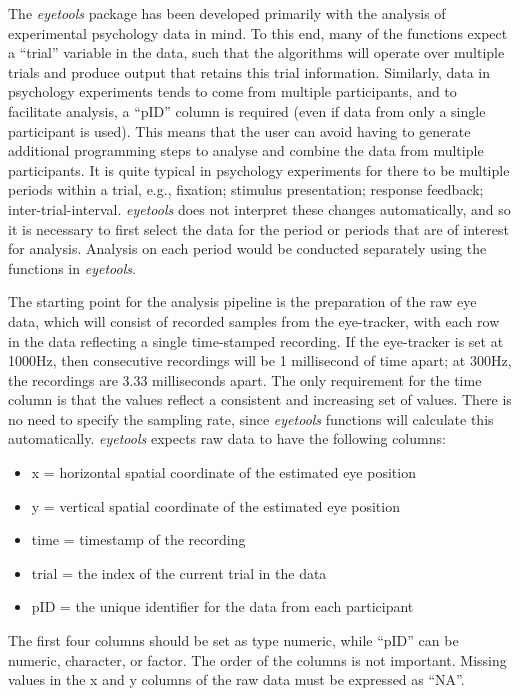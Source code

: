\documentclass[
  man,
  floatsintext,
  longtable,
  nolmodern,
  notxfonts,
  notimes,
  colorlinks=true,linkcolor=blue,citecolor=blue,urlcolor=blue]{apa7}
\begin{document}
The \emph{eyetools} package has been developed primarily with the
analysis of experimental psychology data in mind. To this end, many of
the functions expect a ``trial'' variable in the data, such that the
algorithms will operate over multiple trials and produce output that
retains this trial information. Similarly, data in psychology
experiments tends to come from multiple participants, and to facilitate
analysis, a ``pID'' column is required (even if data from only a single
participant is used). This means that the user can avoid having to
generate additional programming steps to analyse and combine the data
from multiple participants. It is quite typical in psychology
experiments for there to be multiple periods within a trial, e.g.,
fixation; stimulus presentation; response feedback;
inter-trial-interval. \emph{eyetools} does not interpret these changes
automatically, and so it is necessary to first select the data for the
period or periods that are of interest for analysis. Analysis on each
period would be conducted separately using the functions in
\emph{eyetools}.

The starting point for the analysis pipeline is the preparation of the
raw eye data, which will consist of recorded samples from the
eye-tracker, with each row in the data reflecting a single time-stamped
recording. If the eye-tracker is set at 1000Hz, then consecutive
recordings will be 1 millisecond of time apart; at 300Hz, the recordings
are 3.33 milliseconds apart. The only requirement for the time column is
that the values reflect a consistent and increasing set of values. There
is no need to specify the sampling rate, since \emph{eyetools} functions
will calculate this automatically. \emph{eyetools} expects raw data to
have the following columns:

\begin{itemize}
\item
  x = horizontal spatial coordinate of the estimated eye position
\item
  y = vertical spatial coordinate of the estimated eye position
\item
  time = timestamp of the recording
\item
  trial = the index of the current trial in the data
\item
  pID = the unique identifier for the data from each participant
\end{itemize}

The first four columns should be set as type numeric, while ``pID'' can
be numeric, character, or factor. The order of the columns is not
important. Missing values in the x and y columns of the raw data must be
expressed as ``NA''.
\end{document}
